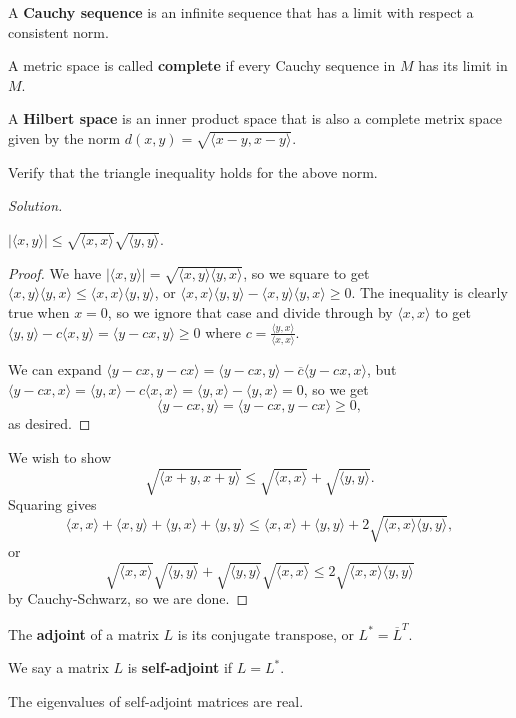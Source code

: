 \begin{df}
A \textbf{Cauchy sequence} is an infinite sequence that has a limit with
respect a consistent norm.
\end{df}

\begin{df}
A metric space is called \textbf{complete} if every Cauchy sequence in
$M$ has its limit in $M$.
\end{df}

\begin{df}
A \textbf{Hilbert space} is an inner product space that is also a
complete metrix space given by the norm $d(x, y) = \sqrt{\langle x - y,
x - y \rangle}$.
\end{df}

\begin{prb}
Verify that the triangle inequality holds for the above norm.
\end{prb}

\begin{proof}[Solution]
\begin{lem}
$|\langle x, y \rangle | \leq \sqrt{\langle x, x \rangle} \sqrt{\langle y,
y \rangle}$.
\end{lem}
\begin{proof}
We have $|\langle x, y \rangle | = \sqrt{\langle x, y \rangle \langle y,
x \rangle}$, so we square to get $\langle x, y \rangle \langle y, x
\rangle \leq \langle x, x \rangle \langle y, y \rangle$, or $\langle x,
x \rangle \langle y, y \rangle - \langle x, y \rangle \langle y, x
\rangle \geq 0$. The inequality is clearly true when $x = 0$, so we
ignore that case and divide through by $\langle x, x \rangle$ to get
$\langle y, y \rangle - c \langle x, y \rangle = \langle y - cx, y
\rangle \geq 0$ where $c = \frac{\langle y, x \rangle}{\langle x, x
\rangle}$.

We can expand $\langle y - cx, y - cx \rangle = \langle y - cx, y
\rangle - \overline{c} \langle y - cx, x \rangle$, but $\langle y - cx,
x \rangle = \langle y, x \rangle - c \langle x, x \rangle = \langle y, x
\rangle - \langle y, x \rangle = 0$, so we get
\[ \langle y - cx, y \rangle = \langle y - cx, y - cx \rangle \geq 0, \]
as desired.

\end{proof}
We wish to show
\[ \sqrt{\langle x + y, x + y \rangle} \leq \sqrt{\langle x, x \rangle}
+ \sqrt{\langle y, y \rangle}. \]
Squaring gives
\[ \langle x, x \rangle + \langle x, y \rangle + \langle y, x \rangle +
\langle y, y \rangle \leq \langle x, x \rangle + \langle y, y \rangle +
2 \sqrt{\langle x, x \rangle \langle y, y \rangle}, \]
or
\[ \sqrt{\langle x, x \rangle} \sqrt{\langle y, y \rangle} +
\sqrt{\langle y, y \rangle} \sqrt{\langle x, x \rangle} \leq 2
\sqrt{\langle x, x \rangle \langle y, y \rangle} \]
by Cauchy-Schwarz, so we are done.
\end{proof}

\begin{df}
The \textbf{adjoint} of a matrix $L$ is its conjugate transpose, or
$L^{*} = \overline{L}^T$.
\end{df}

\begin{df}
We say a matrix $L$ is \textbf{self-adjoint} if $L = L^{*}$.
\end{df}

\begin{rem}
The eigenvalues of self-adjoint matrices are real.
\end{rem}
